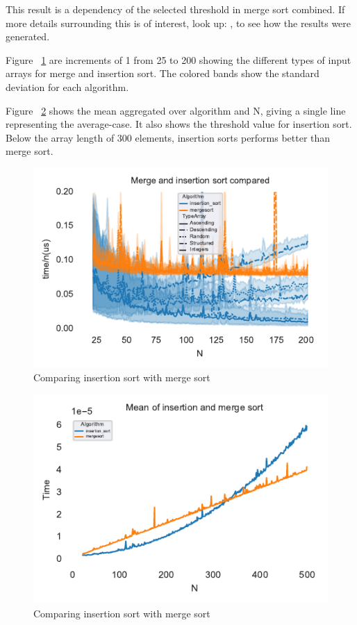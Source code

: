 \documentclass[sigconf, nonacm, natbib, screen, balance=False]{acmart}
\begin{document}
This result is a dependency of the selected threshold in merge sort combined. If more details surrounding this is of interest, look up: \texttt{}, to see how the results were generated. 

Figure ~\ref{fig:ins_merge} are increments of 1 from 25 to 200 showing the different types of input arrays for merge and insertion sort. The colored bands show the standard deviation for each algorithm.

Figure ~\ref{fig:ins_merge_opt} shows the mean aggregated over algorithm and N, giving a single line representing the average-case. It also shows the threshold value for insertion sort. Below the array length of 300 elements, insertion sorts performs better than merge sort.

\begin{figure}[H]
  \centering
  \includegraphics[scale=0.95]{optimizing.pdf}
  \caption{Comparing insertion sort with merge sort}
  \label{fig:ins_merge}
\end{figure}

\begin{figure}[]
  \centering
  \includegraphics[scale=0.75]{optimizing_combined_threshold.pdf}
  \caption{Comparing insertion sort with merge sort}
  \label{fig:ins_merge_opt}
\end{figure}
\end{document}

